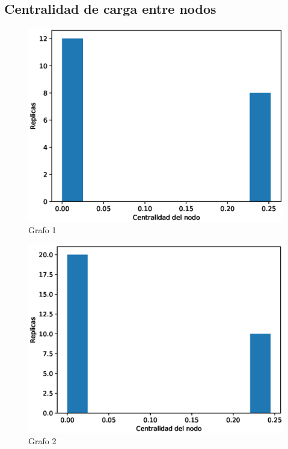 \documentclass{article}
\begin{document}
\subsection{Centralidad de carga entre nodos}
\begin{figure}[H]
    \includegraphics[scale=0.6]{hist-cercania-1}
    \caption{Grafo 1}
    \label{fig:matriz}
\end{figure}
\begin{figure}[H]
    \includegraphics[scale=0.6]{hist-cercania-2}
    \caption{Grafo 2}
    \label{fig:matriz}
\end{figure}
\end{document}
